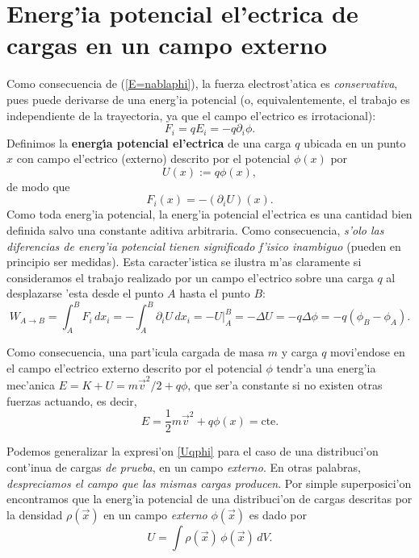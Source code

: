 \section{Energ'ia potencial el'ectrica de cargas en un campo externo}
Como consecuencia de (\ref{E=nablaphi}), la fuerza electrost'atica es
\textit{conservativa}, pues puede derivarse de una energ'ia potencial (o,
equivalentemente, el trabajo es independiente de la trayectoria, ya que el campo
el'ectrico es irrotacional):
\begin{equation}
\boxed{F_i=qE_i=-q\partial_i\phi .}
\end{equation}
Definimos la \textbf{energ\'{\i}a potencial el'ectrica} de una carga $q$ ubicada en un punto $x$ con campo el'ectrico (externo) descrito por el potencial $\phi(x)$ por
\begin{equation}
\boxed{U(x):=q\phi(x),} \label{Uqphi}
\end{equation}
de modo
que
\begin{equation}
\boxed{F_i(x)=-(\partial_iU)(x) .}
\end{equation}
Como toda energ'ia potencial, la energ'ia potencial el'ectrica es una
cantidad bien definida salvo una constante aditiva arbitraria. Como
consecuencia, \textit{s'olo las diferencias de energ'ia potencial tienen
significado f'isico inambiguo} (pueden en principio ser medidas). Esta caracter'istica se
ilustra m'as claramente si consideramos el trabajo realizado por un campo
el'ectrico sobre una carga $q$ al desplazarse 'esta desde el punto $A$ hasta el
punto $B$:
\begin{equation}\label{WABDU}
W_{A\rightarrow B}=\int_A^B F_i\, dx_i=-\int_A^B
\partial_iU\,dx_i=-\left.U\right|_A^B=-\Delta U=-q\Delta\phi=-q(\phi_B-\phi_A).
\end{equation}

Como consecuencia, una part'icula cargada de masa $m$ y carga $q$ movi'endose en el campo el'ectrico externo descrito por el potencial $\phi$ tendr'a una energ'ia mec'anica $E=K+U=m\vec{v}^2/2+q\phi$, que ser'a constante si no existen otras fuerzas actuando, es decir,
\begin{equation}
E=\frac{1}{2}m\vec{v}^2+q\phi(x)=\text{cte.}
\end{equation}

Podemos generalizar la expresi'on \eqref{Uqphi} para el caso de una distribuci'on cont'inua de cargas \textit{de prueba}, en un campo \textit{externo}. En otras palabras, \textit{despreciamos el campo que las mismas cargas producen}. Por simple superposici'on encontramos que la energ'ia potencial de una distribuci'on de cargas descritas por la densidad $\rho(\vec{x})$ en un campo \textit{externo} $\phi(\vec{x})$ es dado por
\begin{equation} \label{Urhophiext}
U=\int \rho(\vec{x})\,\phi(\vec{x})\,dV.
\end{equation}

